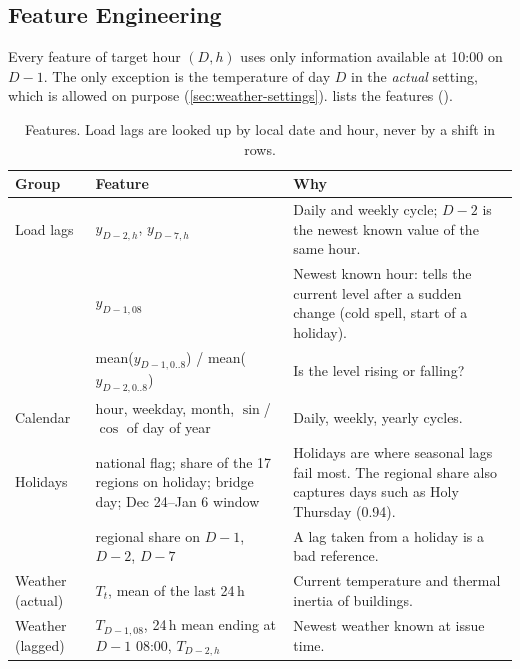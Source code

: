 \subsection{Feature Engineering}
\label{sec:features}

Every feature of target hour $(D,h)$ uses only information available at 10:00 on $D-1$. The only
exception is the temperature of day $D$ in the \emph{actual} setting, which is allowed on purpose
(\cref{sec:weather-settings}).  lists the features ().

\begin{table}[H]
  \centering
  \small
  \caption{Features. Load lags are looked up by local date and hour, never by a shift in rows.}
  \label{tab:features}
  \begin{tabularx}{\linewidth}{@{}l p{4.6cm} Y@{}}
    \toprule
    Group & Feature & Why \\
    \midrule
    Load lags & $y_{D-2,h}$, $y_{D-7,h}$
      & Daily and weekly cycle; $D-2$ is the newest known value of the same hour. \\
      & $y_{D-1,08}$
      & Newest known hour: tells the current level after a sudden change (cold spell, start of a
        holiday). \\
      & mean($y_{D-1,0..8}$) / mean($y_{D-2,0..8}$) & Is the level rising or falling? \\
    Calendar & hour, weekday, month, $\sin$/$\cos$ of day of year & Daily, weekly, yearly cycles. \\
    Holidays & national flag; share of the 17 regions on holiday; bridge day; Dec 24--Jan 6 window
      & Holidays are where seasonal lags fail most. The regional share also captures days such as
        Holy Thursday (0.94). \\
      & regional share on $D-1$, $D-2$, $D-7$ & A lag taken from a holiday is a bad reference. \\
    Weather (actual) & $T_t$, mean of the last 24\,h & Current temperature and thermal inertia of
      buildings. \\
    Weather (lagged) & $T_{D-1,08}$, 24\,h mean ending at $D-1$ 08:00, $T_{D-2,h}$
      & Newest weather known at issue time. \\
    \bottomrule
  \end{tabularx}
\end{table}

